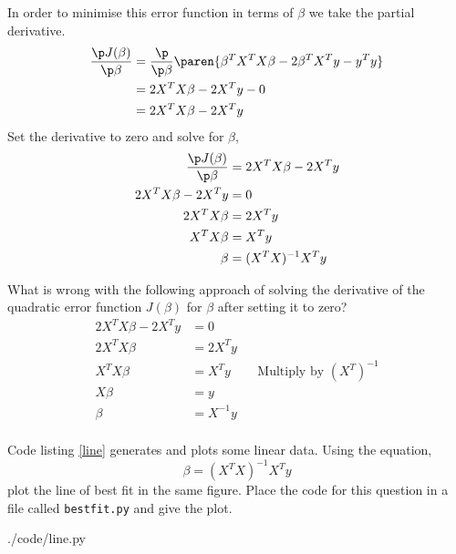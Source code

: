 \documentclass{homework}
\begin{document}
In order to minimise this error function in terms of $\beta$ we take
the partial derivative.
\begin{align*}
  \frac{\p J(\beta)}{\p \beta}
   & = \frac{\p}{\p \beta}\paren{\beta^TX^TX\beta - 2\beta^TX^Ty - y^Ty} \\
   & = 2X^TX\beta - 2X^Ty - 0                                            \\
   & = 2X^TX\beta - 2X^Ty
\end{align*}
Set the derivative to zero and solve for $\beta$,
\begin{align*}
  \frac{\p J(\beta)}{\p \beta} & = 2X^TX\beta - 2X^Ty \\
  2X^TX\beta - 2X^Ty           & = 0                  \\
  2X^TX\beta                   & = 2X^Ty              \\
  X^TX\beta                    & = X^Ty               \\
  \beta                        & = (X^TX)^{-1}X^Ty    \\
\end{align*}

\question What is wrong with the following approach of solving the
derivative of the quadratic error function $J(\beta)$ for $\beta$
after setting it to zero?
\begin{align*}
  2X^TX\beta - 2X^Ty & = 0                                           \\
  2X^TX\beta         & = 2X^Ty                                       \\
  X^TX\beta          & = X^Ty    &  & \text{Multiply by } (X^T)^{-1} \\
  X\beta             & = y                                           \\
  \beta              & = X^{-1}y                                     \\
\end{align*}


\question Code listing \ref{line} generates and plots some linear
data. Using the equation,
\[
  \beta = (X^TX)^{-1}X^Ty
\]
plot the line of best fit in the same figure. Place the code for this
question in a file called \texttt{bestfit.py} and give the plot.


{./code/line.py}

\end{document}
